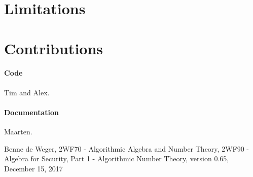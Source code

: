 \documentclass[a4paper]{article}
\begin{document}
\section{Limitations}



\section{Contributions}

\paragraph{Code}

Tim and Alex.

\paragraph{Documentation}

Maarten.


\begin{thebibliography}{9}

  Benne de Weger,
  2WF70 - Algorithmic Algebra and Number Theory,
  2WF90 - Algebra for Security,
  Part 1 - Algorithmic Number Theory,
  version 0.65,
  December 15, 2017

\end{thebibliography}
\end{document}
